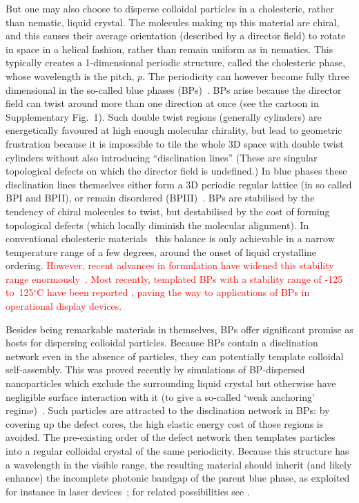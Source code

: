 \documentclass[12pt]{article}
\begin{document}
But one may also choose to disperse colloidal particles in a cholesteric, 
rather than nematic, liquid crystal. The molecules making up this material are
chiral, and this causes their average orientation (described by a director field) to rotate in space in
a helical fashion, rather than remain uniform as in nematics. 
This typically creates a 1-dimensional periodic structure, called the cholesteric phase, whose wavelength 
is the pitch, $p$. The periodicity can however become fully three dimensional in the so-called blue phases (BPs)~\cite{mermin}. BPs arise because the director field can twist around more than one direction at once (see 
the cartoon in Supplementary Fig.~1). Such double twist 
regions (generally cylinders) are energetically favoured at high enough molecular chirality, but
lead to geometric frustration because it is impossible to tile the whole 3D
space with double twist cylinders without also introducing ``disclination lines'' 
(These are singular topological defects on which the director field is 
undefined.) In blue phases these disclination lines themselves either form a 3D periodic regular lattice (in so called BPI and BPII), or remain disordered (BPIII)~\cite{bp3}. 
%
BPs are stabilised by the tendency of chiral molecules to twist, but destabilised by the cost of forming topological defects (which locally diminish the molecular alignment). In conventional cholesteric materials~\cite{mermin} this balance is only achievable in a narrow temperature range of a few degrees, around the onset of liquid crystalline ordering.
\textcolor{red}{
However, recent advances in formulation have widened this stability
range enormously~\cite{kikuchi,bplasers,coleswidetrange,bpdevice}. Most
recently, templated BPs with a stability range of -125
to~125$^\circ$C have been reported \cite{coles}, paving the way to
applications of BPs in operational display devices.}

Besides being remarkable materials in themselves, BPs offer significant promise as hosts for dispersing colloidal particles. Because BPs contain a disclination network even in the absence of
particles, they can potentially template colloidal self-assembly. 
This was proved recently by simulations of BP-dispersed nanoparticles which 
exclude the surrounding liquid crystal but otherwise have negligible surface 
interaction with it (to give a so-called `weak anchoring' regime)~\cite{extrareference1,miha}. 
Such particles are attracted to the disclination network in BPs: by covering up the defect cores, the high elastic energy cost of those regions is avoided. The pre-existing order of the defect network then templates particles into a regular colloidal crystal of the same periodicity. 
Because this structure has a wavelength in the visible range, 
the resulting material should inherit (and likely enhance) the incomplete photonic bandgap of the parent blue phase, as exploited for instance in laser devices~\cite{bplasers}; for related possibilities see \cite{lavrentovich}.
\end{document}
